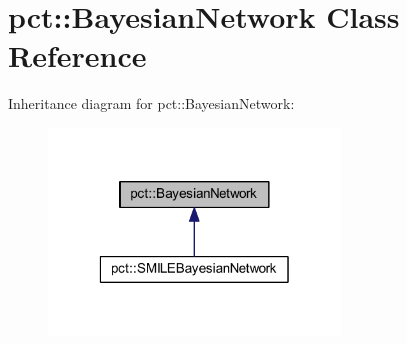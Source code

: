 \hypertarget{classpct_1_1_bayesian_network}{\section{pct\-:\-:Bayesian\-Network Class Reference}
\label{classpct_1_1_bayesian_network}
}


Inheritance diagram for pct\-:\-:Bayesian\-Network\-:\nopagebreak
\begin{figure}[H]
\begin{center}
\leavevmode
\includegraphics[width=220pt]{classpct_1_1_bayesian_network__inherit__graph}
\end{center}
\end{figure}
